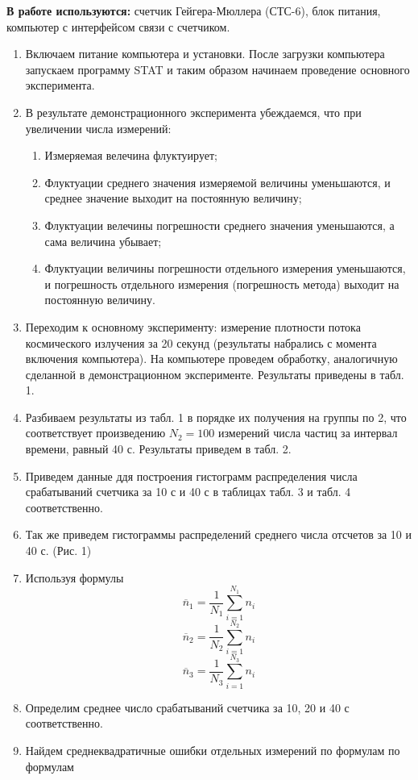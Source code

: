 \documentclass[a4paper, 10pt]{article}%
\begin{document}
\textbf{В работе используются:} счетчик Гейгера-Мюллера (СТС-6), блок питания, компьютер с интерфейсом связи с счетчиком.
\begin{enumerate}
\item Включаем питание компьютера и установки. После загрузки компьютера запускаем программу STAT и таким образом начинаем проведение основного эксперимента. 
\item В результате демонстрационного эксперимента убеждаемся, что при увеличении числа измерений:
\begin{enumerate}
\item Измеряемая велечина флуктуирует;
\item Флуктуации среднего значения измеряемой величины уменьшаются, и среднее значение выходит на постоянную величину;
\item Флуктуации велечины погрешности среднего значения уменьшаются, а сама величина убывает;
\item Флуктуации величины погрешности отдельного измерения уменьшаются, и погрешность отдельного измерения (погрешность метода) выходит на постоянную величину.
\end{enumerate}
\item Переходим к основному эксперименту: измерение плотности потока космического излучения за 20 секунд (результаты набрались с момента включения компьютера). На компьютере проведем обработку, аналогичную сделанной в демонстрационном эксперименте. Результаты приведены в табл. 1.
\item Разбиваем результаты из табл. 1 в порядке их получения на группы по 2, что соответствует произведению $N_2 = 100$ измерений числа частиц за интервал времени, равный 40 с. Результаты приведем в табл. 2.
\item Приведем данные ддя построения гистограмм распределения числа срабатываний счетчика за 10 с и 40 с в таблицах табл. 3 и табл. 4 соответственно. 
\item Так же приведем гистограммы распределений среднего числа отсчетов за 10 и 40 с. (Рис. 1) 
\item Используя формулы
\[ \overline{n}_1 = \dfrac{1}{N_1} \sum_{i = 1}^{N_1} {n_i} 
 \]
 \[ \overline{n}_2 = \dfrac{1}{N_2} \sum_{i = 1}^{N_2} {n_i} 
 \]
 \[ \overline{n}_3 = \dfrac{1}{N_3} \sum_{i = 1}^{N_3} {n_i} 
 \] 
\item Определим среднее число срабатываний счетчика за 10, 20 и 40 с соответственно.
\item Найдем среднеквадратичные ошибки отдельных измерений по формулам по формулам

\end{enumerate}
\end{document}
